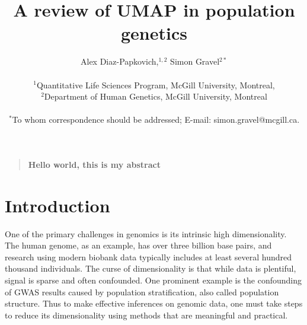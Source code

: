 \documentclass[12pt]{article}
\title{A review of UMAP in population genetics}
\author
{Alex Diaz-Papkovich,$^{1,2}$ Simon Gravel$^{2\ast}$\\
\\
\normalsize{$^{1}$Quantitative Life Sciences Program, McGill University, Montreal,}\\
\normalsize{$^{2}$Department of Human Genetics, McGill University, Montreal}\\
\\
\normalsize{$^\ast$To whom correspondence should be addressed; E-mail:  simon.gravel@mcgill.ca.}
}
\date{}
\newenvironment{sciabstract}{%
\begin{quote} \bf}
{\end{quote}}
\begin{document}
 


\baselineskip24pt


\maketitle 




\begin{sciabstract}
Hello world, this is my abstract
\end{sciabstract}




\section*{Introduction}
One of the primary challenges in genomics is its intrinsic high dimensionality. The human genome, as an example, has over three billion base pairs, and research using modern biobank data typically includes at least several hundred thousand individuals. The curse of dimensionality is that while data is plentiful, signal is sparse and often confounded. One prominent example is the confounding of GWAS results caused by population stratification, also called population structure. Thus to make effective inferences on genomic data, one must take steps to reduce its dimensionality using methods that are meaningful and practical. 
\end{document}

